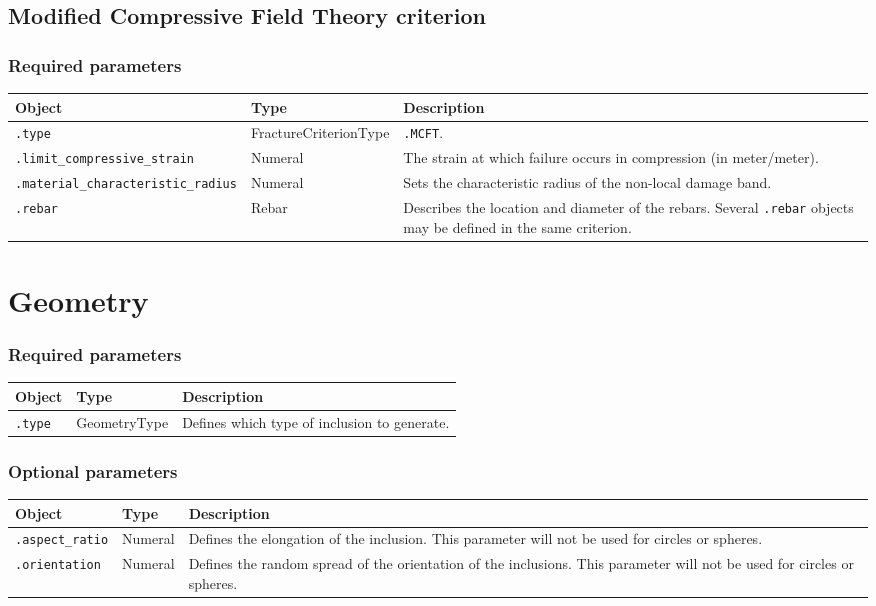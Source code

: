 \documentclass[10pt]{article}
\begin{document}
\subsection{Modified Compressive Field Theory criterion}

\subsubsection*{Required parameters}

\begin{tabularx}{\textwidth}{llX}
\hline 
Object & Type & Description \\ 
\hline 
\verb+.type+ & FractureCriterionType & \verb+.MCFT+. \\ 
\verb+.limit_compressive_strain+ & Numeral & The strain at which failure occurs in compression (in meter/meter).\\
\verb+.material_characteristic_radius+ & Numeral & Sets the characteristic radius of the non-local damage band. \\ 
\verb+.rebar+ & Rebar & Describes the location and diameter of the rebars. Several \verb+.rebar+ objects may be defined in the same criterion.\\
\hline 
\end{tabularx}

\section{Geometry}

\subsubsection*{Required parameters}

\begin{tabularx}{\textwidth}{llX}
\hline 
Object & Type & Description \\ 
\hline 
\verb+.type+ & GeometryType & Defines which type of inclusion to generate. \\ 
\hline 
\end{tabularx}

\subsubsection*{Optional parameters}

\begin{tabularx}{\textwidth}{llX}
\hline 
Object & Type & Description \\ 
\hline 
\verb+.aspect_ratio+ & Numeral & Defines the elongation of the inclusion. This parameter will not be used for circles or spheres. \\ 
\verb+.orientation+ & Numeral & Defines the random spread of the orientation of the inclusions. This parameter will not be used for circles or spheres. \\ 
\hline 
\end{tabularx}
\end{document}
